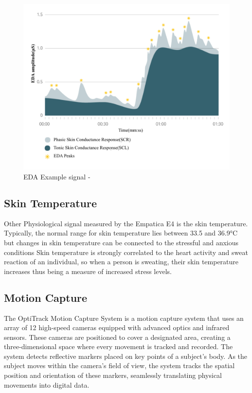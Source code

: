 \begin{figure}[!htbp]
	\centering
	\includegraphics[width=0.8\columnwidth]{images/eda.pdf}
	\caption{EDA Example signal - \parencite{eda}}
	\label{fig:eda sig}
\end{figure}

\subsection*{Skin Temperature }
Other Physiological signal measured by the Empatica E4 is the skin temperature. Typically, the normal range for skin temperature lies between 33.5 and 36.9°C but changes in skin temperature can be connected to the stressful and anxious conditions \parencite{emp2}
Skin temperature is strongly correlated to the heart activity and sweat reaction of an individual, so when a person is sweating, their skin temperature increases thus being a measure of increased stress levels.


\subsection{Motion Capture}
\label{subsec:mocap}
The OptiTrack Motion Capture System is a motion capture system that uses an array of 12 high-speed cameras equipped with advanced optics and infrared sensors. These cameras are positioned to cover a designated area, creating a three-dimensional space where every movement is tracked and recorded. The system detects reflective markers placed on key points of a subject's body. As the subject moves within the camera's field of view, the system tracks the spatial position and orientation of these markers, seamlessly translating physical movements into digital data. 

